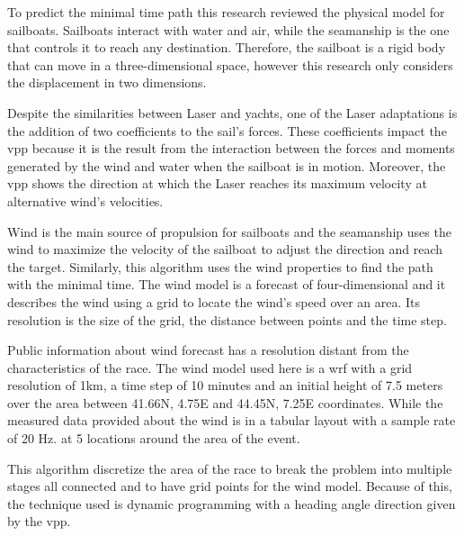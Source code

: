 To predict the minimal time path this research reviewed the physical model for sailboats. Sailboats interact with water and air, while the seamanship is the one that controls it to reach any destination. Therefore, the sailboat is a rigid body that can move in a three-dimensional space, however this research only considers the displacement in two dimensions. \par 
Despite the similarities between Laser and yachts, one of the Laser adaptations is %
the addition of two coefficients %
to the sail's forces. These coefficients impact the \acrfull{vpp} because it is the result from the interaction between the forces and moments generated by the wind and water when the sailboat is in motion. Moreover, the \acrshort{vpp} shows the direction at which the Laser reaches its maximum velocity at alternative wind's velocities. \par %
Wind is the main source of propulsion for sailboats and the seamanship uses the wind to maximize the velocity of the sailboat to adjust the direction and reach the target. Similarly, this algorithm uses the wind properties to  find the path with the minimal time. The wind model is a forecast of four-dimensional and it describes the wind using a grid to locate the wind's speed over an area. Its resolution is the size of the grid, the distance between points and the time step. \par \noindent 
Public information about wind forecast has a resolution distant from the characteristics of the race. The wind model used here is a \acrfull{wrf} with a grid resolution of 1km, a time step of 10 minutes and an initial height of 7.5 meters over the area between 41.66\degree N, 4.75\degree E and 44.45\degree N,  7.25\degree E coordinates. %
While the measured data provided about the wind is in a tabular layout with a sample rate of 20 Hz. at 5 locations around the area of the event. \par 
This algorithm %
discretize the area of the race %
to break the problem into multiple stages all connected and to have grid points for the wind model. Because of this, the technique used is dynamic programming with a heading angle direction given by the \acrshort{vpp}. \par 

